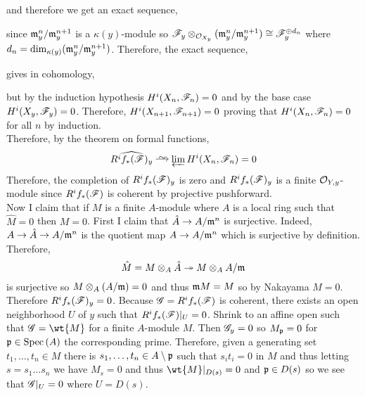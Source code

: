 \documentclass[12pt]{article}
\begin{document}
and therefore we get an exact sequence,
\begin{center}
\end{center}
since $\mathfrak{m}_y^n / \mathfrak{m}_y^{n+1}$ is a $\kappa(y)$-module so $\mathscr{F}_y \otimes_{\mathcal{O}_{X_y}} (\mathfrak{m}_y^n / \mathfrak{m}_y^{n+1}) \cong \mathscr{F}_y^{\oplus d_n}$ where $d_n = \dim_{\kappa(y)} (\mathfrak{m}_y^n / \mathfrak{m}_y^{n+1})$. Therefore, the exact sequence,
\begin{center}
\end{center}
gives in cohomology,
\begin{center}
\end{center}
but by the induction hypothesis $H^i(X_n, \mathscr{F}_n) = 0$ and by the base case $H^i(X_y, \mathscr{F}_y) = 0$. Therefore, $H^i(X_{n+1}, \mathscr{F}_{n+1}) = 0$ proving that $H^i(X_n, \mathscr{F}_n) = 0$ for all $n$ by induction.
\bigskip\\
Therefore, by the theorem on formal functions,
\[ \widehat{R^i f_*(\F)_y} \iso \varprojlim H^i(X_n, \F_n) = 0 \]
Therefore, the completion of $R^i f_*(\mathscr{F})_y$ is zero and $R^i f_*(\mathscr{F})_y$ is a finite $\mathcal{O}_{Y, y}$-module since $R^i f_*(\mathscr{F})$ is coherent by projective pushforward.
\bigskip\\
Now I claim that if $M$ is a finite $A$-module where $A$ is a local ring such that $\hat{M} = 0$ then $M = 0$. First I claim that $\hat{A} \to A / \mathfrak{m}^n$ is surjective. Indeed, $A \to \hat{A} \to A / \mathfrak{m}^n$ is the quotient map $A \to A / \mathfrak{m}^n$ which is surjective by definition. Therefore,
\[ \hat{M} = M \otimes_A \hat{A} \twoheadrightarrow M \otimes_A A / \mathfrak{m} \]
is surjective so $M \otimes_A (A / \mathfrak{m}) = 0$ and thus $\mathfrak{m} M = M$ so by Nakayama $M = 0$.
\bigskip\\
Therefore $R^i f_* (\mathscr{F})_y = 0$. Because $\mathscr{G} = R^i f_*(\mathscr{F})$ is coherent, there exists an open neighborhood $U$ of $y$ such that $R^i f_*(\mathscr{F})|_U = 0$. Shrink to an affine open such that $\G = \wt{M}$ for a finite $A$-module $M$. Then $\mathscr{G}_y = 0$ so $M_{\mathfrak{p}} = 0$ for $\mathfrak{p} \in \mathrm{Spec}\left( A \right)$ the corresponding prime. Therefore, given a generating set $t_1, \dots, t_n \in M$ there is $s_1, \dots, t_n \in A \setminus \mathfrak{p}$ such that $s_i t_i = 0$ in $M$ and thus letting $s = s_1 \dots s_n$ we have $M_s = 0$ and thus $\wt{M}|_{D(s)} = 0$ and $\mathfrak{p} \in D(s)$ so we see that $\mathscr{G}|_U = 0$ where $U = D(s)$. 
\end{document}
